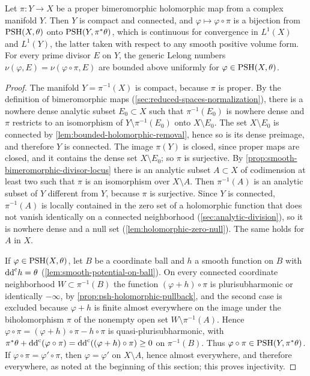 \begin{proposition}\label{prop:smooth-target-psh-modification}
Let $\pi\colon Y\to X$ be a proper bimeromorphic holomorphic map from a complex manifold $Y$. Then $Y$ is compact and connected, and $\varphi\mapsto\varphi\circ\pi$ is a bijection from $\mathrm{PSH}(X,\theta)$ onto $\mathrm{PSH}(Y,\pi^*\theta)$, which is continuous for convergence in $L^1(X)$ and $L^1(Y)$, the latter taken with respect to any smooth positive volume form. For every prime divisor $E$ on $Y$, the generic Lelong numbers $\nu(\varphi,E)=\nu(\varphi\circ\pi,E)$ are bounded above uniformly for $\varphi\in\mathrm{PSH}(X,\theta)$.
\end{proposition}
\begin{proof}
The manifold $Y=\pi^{-1}(X)$ is compact, because $\pi$ is proper. By the definition of bimeromorphic maps (\cref{sec:reduced-spaces-normalization}), there is a nowhere dense analytic subset $E_0\subset X$ such that $\pi^{-1}(E_0)$ is nowhere dense and $\pi$ restricts to an isomorphism of $Y\setminus\pi^{-1}(E_0)$ onto $X\setminus E_0$. The set $X\setminus E_0$ is connected by \cref{lem:bounded-holomorphic-removal}, hence so is its dense preimage, and therefore $Y$ is connected. The image $\pi(Y)$ is closed, since proper maps are closed, and it contains the dense set $X\setminus E_0$; so $\pi$ is surjective. By \cref{prop:smooth-bimeromorphic-divisor-locus} there is an analytic subset $A\subset X$ of codimension at least two such that $\pi$ is an isomorphism over $X\setminus A$. Then $\pi^{-1}(A)$ is an analytic subset of $Y$ different from $Y$, because $\pi$ is surjective. Since $Y$ is connected, $\pi^{-1}(A)$ is locally contained in the zero set of a holomorphic function that does not vanish identically on a connected neighborhood (\cref{sec:analytic-division}), so it is nowhere dense and a null set (\cref{lem:holomorphic-zero-null}). The same holds for $A$ in $X$.

If $\varphi\in\mathrm{PSH}(X,\theta)$, let $B$ be a coordinate ball and $h$ a smooth function on $B$ with $\mathrm{dd}^{\mathrm{c}} h=\theta$ (\cref{lem:smooth-potential-on-ball}). On every connected coordinate neighborhood $W\subset\pi^{-1}(B)$ the function $(\varphi+h)\circ\pi$ is plurisubharmonic or identically $-\infty$, by \cref{prop:psh-holomorphic-pullback}, and the second case is excluded because $\varphi+h$ is finite almost everywhere on the image under the biholomorphism $\pi$ of the nonempty open set $W\setminus\pi^{-1}(A)$. Hence $\varphi\circ\pi=(\varphi+h)\circ\pi-h\circ\pi$ is quasi-plurisubharmonic, with $\pi^*\theta+\mathrm{dd}^{\mathrm{c}}(\varphi\circ\pi)=\mathrm{dd}^{\mathrm{c}}((\varphi+h)\circ\pi)\geq0$ on $\pi^{-1}(B)$. Thus $\varphi\circ\pi\in\mathrm{PSH}(Y,\pi^*\theta)$. If $\varphi\circ\pi=\varphi'\circ\pi$, then $\varphi=\varphi'$ on $X\setminus A$, hence almost everywhere, and therefore everywhere, as noted at the beginning of this section; this proves injectivity.


\end{proof}
